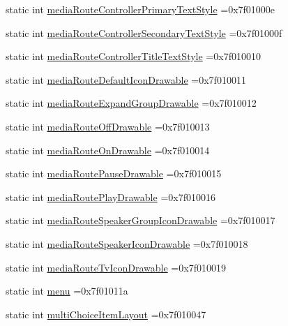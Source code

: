 \begin{DoxyCompactItemize}
static int \hyperlink{classandroid_1_1support_1_1design_1_1R_1_1attr_a91d44ac9a4618022f23575c15831be52}{media\+Route\+Controller\+Primary\+Text\+Style} =0x7f01000e
\item 
static int \hyperlink{classandroid_1_1support_1_1design_1_1R_1_1attr_a59d0d8f5380e3f68d1427ea6280fc3e2}{media\+Route\+Controller\+Secondary\+Text\+Style} =0x7f01000f
\item 
static int \hyperlink{classandroid_1_1support_1_1design_1_1R_1_1attr_a89cd18b286db9612053328d3ed645da6}{media\+Route\+Controller\+Title\+Text\+Style} =0x7f010010
\item 
static int \hyperlink{classandroid_1_1support_1_1design_1_1R_1_1attr_abaad978aa70c86cdf43436543749e283}{media\+Route\+Default\+Icon\+Drawable} =0x7f010011
\item 
static int \hyperlink{classandroid_1_1support_1_1design_1_1R_1_1attr_a73d4cfc0032f404630269bbe60787c97}{media\+Route\+Expand\+Group\+Drawable} =0x7f010012
\item 
static int \hyperlink{classandroid_1_1support_1_1design_1_1R_1_1attr_a8ec4ff305503ea2d867e9f60e6cfcba7}{media\+Route\+Off\+Drawable} =0x7f010013
\item 
static int \hyperlink{classandroid_1_1support_1_1design_1_1R_1_1attr_a7afb375f1168275b29d8b50d23657aba}{media\+Route\+On\+Drawable} =0x7f010014
\item 
static int \hyperlink{classandroid_1_1support_1_1design_1_1R_1_1attr_a1a5d2fd5b418b463a50cd92cf1e993d5}{media\+Route\+Pause\+Drawable} =0x7f010015
\item 
static int \hyperlink{classandroid_1_1support_1_1design_1_1R_1_1attr_a7a1ff3b1c6be478e58e84b0ffd9e6325}{media\+Route\+Play\+Drawable} =0x7f010016
\item 
static int \hyperlink{classandroid_1_1support_1_1design_1_1R_1_1attr_a7da2255a9d37f82edfc927653a263c6f}{media\+Route\+Speaker\+Group\+Icon\+Drawable} =0x7f010017
\item 
static int \hyperlink{classandroid_1_1support_1_1design_1_1R_1_1attr_a6007c27b2061cb105a1b2a5722a149bb}{media\+Route\+Speaker\+Icon\+Drawable} =0x7f010018
\item 
static int \hyperlink{classandroid_1_1support_1_1design_1_1R_1_1attr_a9b0e6cfc3639a928ff4e7c4311fb951a}{media\+Route\+Tv\+Icon\+Drawable} =0x7f010019
\item 
static int \hyperlink{classandroid_1_1support_1_1design_1_1R_1_1attr_af8dccc21578a5e68732ac4a904297821}{menu} =0x7f01011a
\item 
static int \hyperlink{classandroid_1_1support_1_1design_1_1R_1_1attr_a52df08b0a39a788dc12dab79f50da855}{multi\+Choice\+Item\+Layout} =0x7f010047

\end{DoxyCompactItemize}
